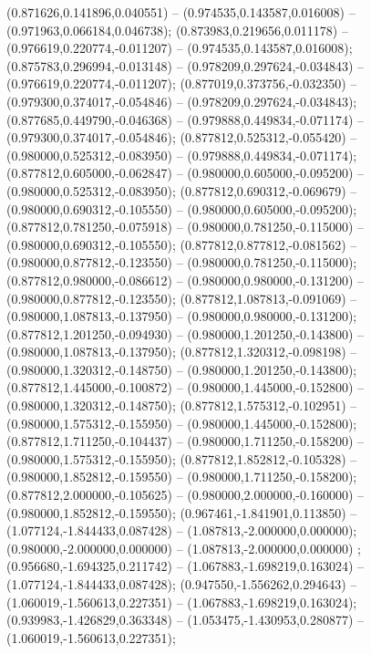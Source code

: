  (0.871626,0.141896,0.040551) -- (0.974535,0.143587,0.016008) -- (0.971963,0.066184,0.046738);
 (0.873983,0.219656,0.011178) -- (0.976619,0.220774,-0.011207) -- (0.974535,0.143587,0.016008);
 (0.875783,0.296994,-0.013148) -- (0.978209,0.297624,-0.034843) -- (0.976619,0.220774,-0.011207);
 (0.877019,0.373756,-0.032350) -- (0.979300,0.374017,-0.054846) -- (0.978209,0.297624,-0.034843);
 (0.877685,0.449790,-0.046368) -- (0.979888,0.449834,-0.071174) -- (0.979300,0.374017,-0.054846);
 (0.877812,0.525312,-0.055420) -- (0.980000,0.525312,-0.083950) -- (0.979888,0.449834,-0.071174);
 (0.877812,0.605000,-0.062847) -- (0.980000,0.605000,-0.095200) -- (0.980000,0.525312,-0.083950);
 (0.877812,0.690312,-0.069679) -- (0.980000,0.690312,-0.105550) -- (0.980000,0.605000,-0.095200);
 (0.877812,0.781250,-0.075918) -- (0.980000,0.781250,-0.115000) -- (0.980000,0.690312,-0.105550);
 (0.877812,0.877812,-0.081562) -- (0.980000,0.877812,-0.123550) -- (0.980000,0.781250,-0.115000);
 (0.877812,0.980000,-0.086612) -- (0.980000,0.980000,-0.131200) -- (0.980000,0.877812,-0.123550);
 (0.877812,1.087813,-0.091069) -- (0.980000,1.087813,-0.137950) -- (0.980000,0.980000,-0.131200);
 (0.877812,1.201250,-0.094930) -- (0.980000,1.201250,-0.143800) -- (0.980000,1.087813,-0.137950);
 (0.877812,1.320312,-0.098198) -- (0.980000,1.320312,-0.148750) -- (0.980000,1.201250,-0.143800);
 (0.877812,1.445000,-0.100872) -- (0.980000,1.445000,-0.152800) -- (0.980000,1.320312,-0.148750);
 (0.877812,1.575312,-0.102951) -- (0.980000,1.575312,-0.155950) -- (0.980000,1.445000,-0.152800);
 (0.877812,1.711250,-0.104437) -- (0.980000,1.711250,-0.158200) -- (0.980000,1.575312,-0.155950);
 (0.877812,1.852812,-0.105328) -- (0.980000,1.852812,-0.159550) -- (0.980000,1.711250,-0.158200);
 (0.877812,2.000000,-0.105625) -- (0.980000,2.000000,-0.160000) -- (0.980000,1.852812,-0.159550);
 (0.967461,-1.841901,0.113850) -- (1.077124,-1.844433,0.087428) -- (1.087813,-2.000000,0.000000);
 (0.980000,-2.000000,0.000000) -- (1.087813,-2.000000,0.000000) ;
 (0.956680,-1.694325,0.211742) -- (1.067883,-1.698219,0.163024) -- (1.077124,-1.844433,0.087428);
 (0.947550,-1.556262,0.294643) -- (1.060019,-1.560613,0.227351) -- (1.067883,-1.698219,0.163024);
 (0.939983,-1.426829,0.363348) -- (1.053475,-1.430953,0.280877) -- (1.060019,-1.560613,0.227351);
